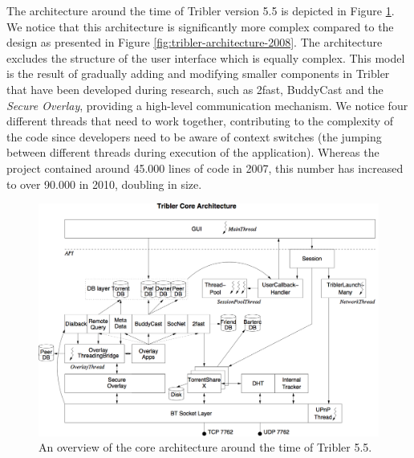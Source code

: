 The architecture around the time of Tribler version 5.5 is depicted in Figure \ref{fig:tribler-core-architecture-55}. We notice that this architecture is significantly more complex compared to the design as presented in Figure \ref{fig:tribler-architecture-2008}. The architecture excludes the structure of the user interface which is equally complex. This model is the result of gradually adding and modifying smaller components in Tribler that have been developed during research, such as 2fast, BuddyCast and the \emph{Secure Overlay}, providing a high-level communication mechanism. We notice four different threads that need to work together, contributing to the complexity of the code since developers need to be aware of context switches (the jumping between different threads during execution of the application). Whereas the project contained around 45.000 lines of code in 2007, this number has increased to over 90.000 in 2010, doubling in size.

\begin{figure}[h!]
	\centering
	\includegraphics[width=1.0\columnwidth]{images/architecture/core_architecture_55}
	\caption{An overview of the core architecture around the time of Tribler 5.5.}
	\label{fig:tribler-core-architecture-55}
\end{figure}

